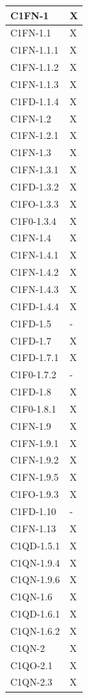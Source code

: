 \begin{footnotesize}
\begin{longtable}{|p{}|p{}|}
 C1FN-1 &X \\ \hline
 C1FN-1.1 &X  \\ \hline
 C1FN-1.1.1 &X  \\ \hline
 C1FN-1.1.2  &X  \\ \hline
 C1FN-1.1.3 &X  \\ \hline
 C1FD-1.1.4  &X  \\ \hline
 C1FN-1.2 &X  \\ \hline
 C1FN-1.2.1 &X  \\ \hline
 C1FN-1.3 &X  \\ \hline
 C1FN-1.3.1  &X  \\ \hline
 C1FD-1.3.2 &X  \\ \hline
 C1FO-1.3.3 &X  \\ \hline
 C1F0-1.3.4 &X  \\ \hline
 C1FN-1.4 &X  \\ \hline
 C1FN-1.4.1 &X  \\ \hline
 C1FN-1.4.2 &X  \\ \hline
 C1FN-1.4.3 &X  \\ \hline
 C1FD-1.4.4 &X  \\ \hline
 C1FD-1.5 &-  \\ \hline
 C1FD-1.7 &X  \\ \hline
 C1FD-1.7.1  &X  \\ \hline
 C1F0-1.7.2 &-  \\ \hline
 C1FD-1.8 &X  \\ \hline
 C1F0-1.8.1 &X  \\ \hline
 C1FN-1.9 &X  \\ \hline
 C1FN-1.9.1  &X  \\ \hline
 C1FN-1.9.2 &X  \\ \hline
 C1FN-1.9.5 &X  \\ \hline
 C1FO-1.9.3 &X  \\ \hline
 C1FD-1.10 &-  \\ \hline
 C1FN-1.13 &X  \\ \hline
 C1QD-1.5.1 &X  \\ \hline
 C1QN-1.9.4 &X  \\ \hline
 C1QN-1.9.6 &X  \\ \hline
 C1QN-1.6 &X \\ \hline
 C1QD-1.6.1&X \\ \hline
 C1QN-1.6.2&X   \\ \hline
 C1QN-2&X \\ \hline
 C1QO-2.1&X \\ \hline
 C1QN-2.3&X  \\ \hline

\end{longtable}
\end{footnotesize}
